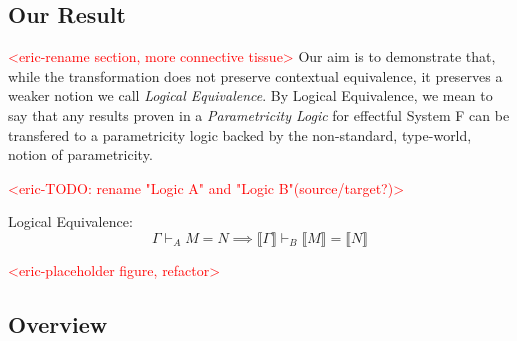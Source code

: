 \documentclass[acmsmall]{acmart}
\newcommand{\den}[1]{\llbracket #1\rrbracket}
\newcommand{\eric}[1]{\textcolor{red}{ <eric-#1> }}
\begin{document}
\subsection{Our Result}
\eric{rename section, more connective tissue}
Our aim is to demonstrate that, while the transformation does not preserve contextual equivalence, it preserves a weaker notion we call \textit{Logical Equivalence}. By Logical Equivalence, we mean to say that any results proven in a \textit{Parametricity Logic}\cite{APL}\cite{LAPL}\cite{PE} for effectful System F can be transfered to a parametricity logic backed by the non-standard, type-world, notion of parametricity.

\eric{TODO: rename "Logic A" and "Logic B"(source/target?)}
\begin{theorem}
  Logical Equivalence:
  $$\Gamma \vdash_A M = N \implies \den{\Gamma} \vdash_B \den{M} = \den{N}$$
\end{theorem}

\eric{placeholder figure, refactor}
\begin{figure}[H]
\end{figure}

\subsection{Overview}
\end{document}

